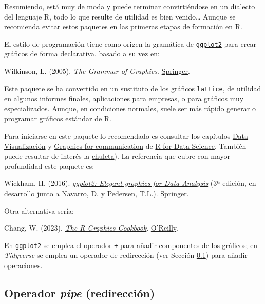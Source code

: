 \documentclass[
]{book}
\theoremstyle{break}
\theoremstyle{nonumberplain}
\begin{document}
Resumiendo, está muy de moda y puede terminar convirtiéndose en un dialecto del lenguaje R, todo lo que resulte de utilidad es bien venido\ldots{} Aunque se recomienda evitar estos paquetes en las primeras etapas de formación en R.

El estilo de programación tiene como origen la gramática de \href{https://ggplot2.tidyverse.org}{\texttt{ggplot2}} para crear gráficos de forma declarativa, basado a su vez en:

Wilkinson, L. (2005). \emph{The Grammar of Graphics}. \href{https://www.google.es/books/edition/The_Grammar_of_Graphics/YGgUswEACAAJ?hl=es}{Springer}.

Este paquete se ha convertido en un sustituto de los gráficos \href{http://lattice.r-forge.r-project.org/}{\texttt{lattice}}, de utilidad en algunos informes finales, aplicaciones para empresas, o para gráficos muy especializados. Aunque, en condiciones normales, suele ser más rápido generar o programar gráficos estándar de R.

Para iniciarse en este paquete lo recomendado es consultar los capítulos \href{https://r4ds.had.co.nz/data-visualisation.html}{Data Visualización} y \href{https://r4ds.had.co.nz/graphics-for-communication.html}{Graphics for communication} de \href{https://r4ds.had.co.nz}{R for Data Science}.
También puede resultar de interés la \href{https://github.com/rstudio/cheatsheets/blob/master/data-visualization.pdf}{chuleta}).
La referencia que cubre con mayor profundidad este paquete es:

Wickham, H. (2016). \emph{\href{https://ggplot2-book.org}{ggplot2: Elegant graphics for Data Analysis}} (3ª edición, en desarrollo junto a Navarro, D. y Pedersen, T.L.). \href{https://www.amazon.com/gp/product/331924275X}{Springer}.

Otra alternativa sería:

Chang, W. (2023). \emph{\href{https://r-graphics.org}{The R Graphics Cookbook}}. \href{https://www.amazon.com/dp/1491978600}{O'Reilly}.

En \href{https://ggplot2.tidyverse.org}{\texttt{ggplot2}} se emplea el operador \texttt{+} para añadir componentes de los gráficos; en \emph{Tidyverse} se emplea un operador de redirección (ver Sección \ref{pipe}) para añadir operaciones.

\subsection{\texorpdfstring{Operador \emph{pipe} (redirección)}{Operador pipe (redirección)}}\label{pipe}
\end{document}
